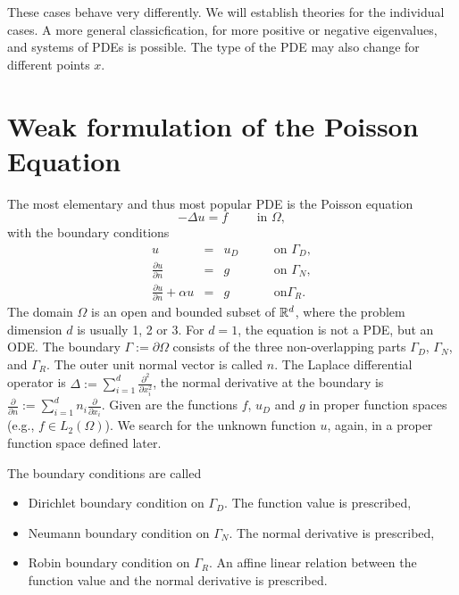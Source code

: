 %
These cases behave very differently. We will establish theories for
the individual cases.  A more general classicfication, for more
positive or negative eigenvalues, and systems of PDEs is possible. The
type of the PDE may also change for different points $x$.






\section{Weak formulation of the Poisson Equation}
\label{sec_intro}
The most elementary and thus most popular PDE is the Poisson equation
\begin{equation}
\label{equ_laplace}
-\Delta u = f \qquad \mbox{ in } \Omega,
\end{equation}
with the boundary conditions
\begin{equation}
\label{equ_laplace_bc}
\begin{array}{rcll}
u & = & u_D \qquad & \mbox{on } \Gamma_D, \\
\frac{\partial u}{\partial n} & = & g \qquad & \mbox{on } \Gamma_N, \\
\frac{\partial u}{\partial n} + \alpha u & = & g \qquad & \mbox{on} \Gamma_R.
\end{array}
\end{equation}
%
The domain $\Omega$ is an open and bounded subset of ${\mathbb R}^d$, where
the problem dimension $d$ is usually 1, 2 or 3. For $d = 1$, the
equation is not a PDE, but an ODE. The boundary $\Gamma := \partial
\Omega$ consists of the three non-overlapping parts $\Gamma_D$,
$\Gamma_N$, and $\Gamma_R$. The outer
unit normal vector is called $n$. The Laplace differential operator is
$\Delta := \sum_{i=1}^d
\frac{\partial^2}{\partial x_i^2}$, the normal derivative at the
boundary is $\frac{\partial}{\partial n} := \sum_{i=1}^d n_i
\frac{\partial}{\partial x_i}$. Given are the functions $f$, $u_D$ and
$g$ in proper function spaces (e.g., $f \in L_2(\Omega)$). We search for
the unknown function $u$, again, in a proper function space defined later. 

The boundary conditions are called
\begin{itemize}
\item 
Dirichlet boundary condition on $\Gamma_D$. The function value is prescribed,
\item
Neumann boundary condition on $\Gamma_N$. The normal derivative is prescribed,
\item
Robin boundary condition on $\Gamma_R$. An affine linear relation between
the function value and the normal derivative is prescribed.
\end{itemize}

